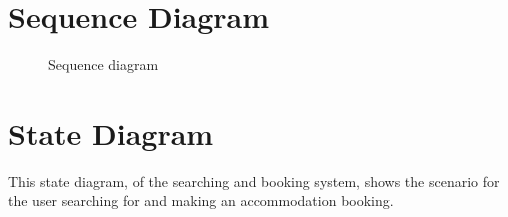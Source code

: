 \documentclass[a4paper]{article}
\begin{document}
\section{Sequence Diagram}
\begin{figure}[h!]
	\centering
	\caption{Sequence diagram}
\end{figure}
\clearpage

\section{State Diagram}

This state diagram, of the searching and booking system, shows the scenario for
the user searching for and making an accommodation booking.
\end{document}
